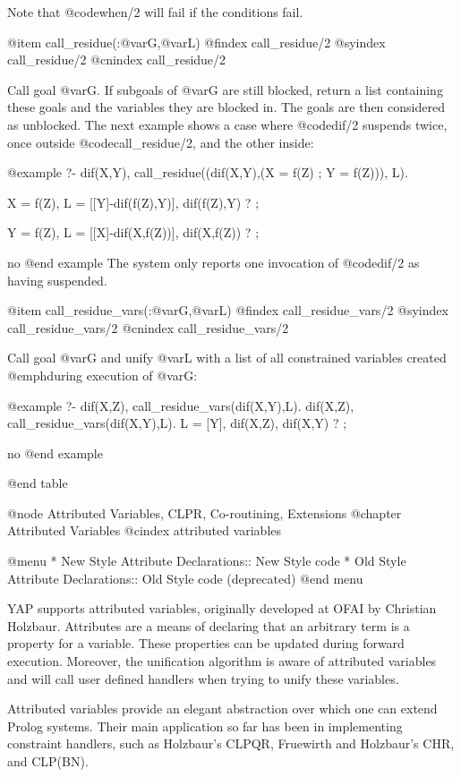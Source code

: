{{{{{{{{Note that @code{when/2} will fail if the conditions fail.

@item call_residue(:@var{G},@var{L})
@findex call_residue/2
@syindex call_residue/2
@cnindex call_residue/2

Call goal @var{G}. If subgoals of @var{G} are still blocked, return
a list containing these goals and the variables they are blocked in. The
goals are then considered as unblocked. The next example shows a case
where @code{dif/2} suspends twice, once outside @code{call_residue/2},
and the other inside:

@example
?- dif(X,Y),
       call_residue((dif(X,Y),(X = f(Z) ; Y = f(Z))), L).

X = f(Z),
L = [[Y]-dif(f(Z),Y)],
dif(f(Z),Y) ? ;

Y = f(Z),
L = [[X]-dif(X,f(Z))],
dif(X,f(Z)) ? ;

no
@end example
The system only reports one invocation of @code{dif/2} as having
suspended. 

@item call_residue_vars(:@var{G},@var{L})
@findex call_residue_vars/2
@syindex call_residue_vars/2
@cnindex call_residue_vars/2

Call goal @var{G} and unify @var{L} with a list of all constrained variables created @emph{during} execution of @var{G}:

@example
  ?- dif(X,Z), call_residue_vars(dif(X,Y),L).
dif(X,Z), call_residue_vars(dif(X,Y),L).
L = [Y],
dif(X,Z),
dif(X,Y) ? ;

no
@end example

@end table

@node Attributed Variables, CLPR, Co-routining, Extensions
@chapter Attributed Variables
@cindex attributed variables

@menu
* New Style Attribute Declarations:: New Style code
* Old Style Attribute Declarations:: Old Style code (deprecated)
@end menu

YAP supports attributed variables, originally developed at OFAI by
Christian Holzbaur. Attributes are a means of declaring that an
arbitrary term is a property for a variable. These properties can be
updated during forward execution. Moreover, the unification algorithm is
aware of attributed variables and will call user defined handlers when
trying to unify these variables.

Attributed variables provide an elegant abstraction over which one can
extend Prolog systems. Their main application so far has been in
implementing constraint handlers, such as Holzbaur's CLPQR, Fruewirth
and Holzbaur's CHR, and CLP(BN). 

}}}}}}}}
